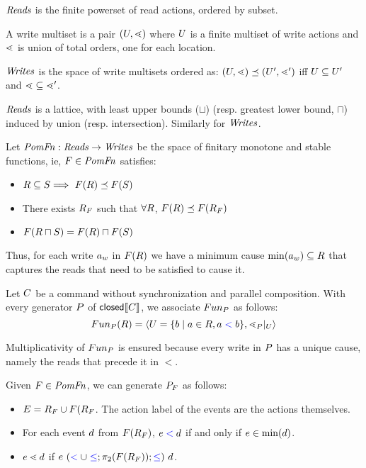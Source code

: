 \begin{definition}
$\mathit{Reads}$ is the finite powerset of read actions, ordered by subset.  

A write multiset is a pair $(U,\lessdot)$ where $U$ is a finite multiset of write actions and $\lessdot$ is union of total orders, one for each location. 

$\mathit{Writes}$ is the space of write multisets ordered as:
$(U,\lessdot) \preceq (U',\lessdot')$ iff $U \subseteq U'$ and $\lessdot \subseteq \lessdot'$.
\end{definition}

$\mathit{Reads}$ is a lattice, with least upper bounds ($\sqcup$) (resp. greatest lower bound, $\sqcap$)  induced by union (resp. intersection).  Similarly for $\mathit{Writes}$. 

\begin{definition}
Let $\mathit{PomFn}: \mathit{Reads} \rightarrow \mathit{Writes}$ be the space of finitary monotone and stable functions, ie, $F \in \mathit{PomFn}$ satisfies:
\begin{itemize}
\item $R \subseteq S \Longrightarrow\ F(R) \preceq F(S)$
\item There exists $R_{F}$ such that $\forall R$, $F(R) \preceq F(R_{F})$
\item $F(R \sqcap S) =  F(R) \sqcap F(S)$
\end{itemize}
\end{definition}
Thus, for each write  $a_w$ in $F(R)$ we have a minimum cause $\min(a_w) \subseteq R$ that captures the reads that need to be satisfied to cause it.   

\begin{definition}
Let $C$ be a command without synchronization and parallel composition.   With every generator $P$ of  $\textsf{closed}\llbracket C\rrbracket$, we associate $Fun_{P}$ as follows:
\[ Fun_{P}(R) = \langle U = \{ b \mid a \in R, a \mathrel{{\color{blue}<}} b \}, \lessdot_{P} \mathbin{|}_{U} \rangle \]
\end{definition}
Multiplicativity  of $Fun_{P}$ is ensured because every write in $P$ has a unique cause, namely the reads that precede it in $\lt$.

\begin{definition}
Given $F \in \mathit{PomFn}$, we can generate $P_{F}$ as follows:
\begin{itemize}
\item $E = R_{F} \cup F(R_{F}$.  The action label of the events are the actions themselves.  
\item For each event $d$ from $F(R_{F})$, $e \mathrel{{\color{blue}<}} d$ if and only if $e \in \min(d)$.
\item $e \lessdot d$ if $ e\ (\mathrel{{\color{blue}<}} \cup \mathrel{{\color{blue}\leq}};\pi_2(F(R_{F})); \mathrel{{\color{blue}\leq}}) \  d$.
\end{itemize}
\end{definition}

